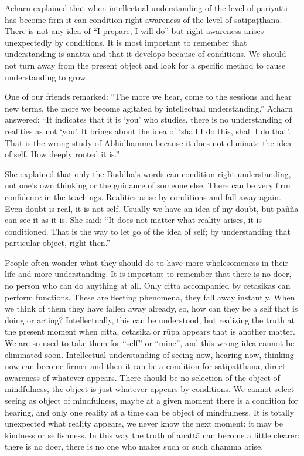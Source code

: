 Acharn explained that when intellectual understanding of the level of
pariyatti has become firm it can condition right awareness of the level
of satipaṭṭhāna. There is not any idea of ``I prepare, I will do'' but
right awareness arises unexpectedly by conditions. It is most important
to remember that understanding is anattā and that it develops because of
conditions. We should not turn away from the present object and look for
a specific method to cause understanding to grow.

One of our friends remarked: ``The more we hear, come to the sessions
and hear new terms, the more we become agitated by intellectual
understanding.'' Acharn answered: ``It indicates that it is `you' who
studies, there is no understanding of realities as not `you'. It brings
about the idea of `shall I do this, shall I do that'. That is the wrong
study of Abhidhamma because it does not eliminate the idea of self. How
deeply rooted it is.''

She explained that only the Buddha's words can condition right
understanding, not one's own thinking or the guidance of someone else.
There can be very firm confidence in the teachings. Realities arise by
conditions and fall away again. Even doubt is real, it is not self.
Usually we have an idea of my doubt, but paññā can see it as it is. She
said: ``It does not matter what reality arises, it is conditioned. That
is the way to let go of the idea of self; by understanding that
particular object, right then.''

People often wonder what they should do to have more wholesomeness in
their life and more understanding. It is important to remember that
there is no doer, no person who can do anything at all. Only citta
accompanied by cetasikas can perform functions. These are fleeting
phenomena, they fall away instantly. When we think of them they have
fallen away already, so, how can they be a self that is doing or acting?
Intellectually, this can be understood, but realizing the truth at the
present moment when citta, cetasika or rūpa appears that is another
matter. We are so used to take them for ``self'' or ``mine'', and this
wrong idea cannot be eliminated soon. Intellectual understanding of
seeing now, hearing now, thinking now can become firmer and then it can
be a condition for satipaṭṭhāna, direct awareness of whatever appears.
There should be no selection of the object of mindfulness, the object is
just whatever appears by conditions. We cannot select seeing as object
of mindfulness, maybe at a given moment there is a condition for
hearing, and only one reality at a time can be object of mindfulness. It
is totally unexpected what reality appears, we never know the next
moment: it may be kindness or selfishness. In this way the truth of
anattā can become a little clearer: there is no doer, there is no one
who makes such or such dhamma arise.

